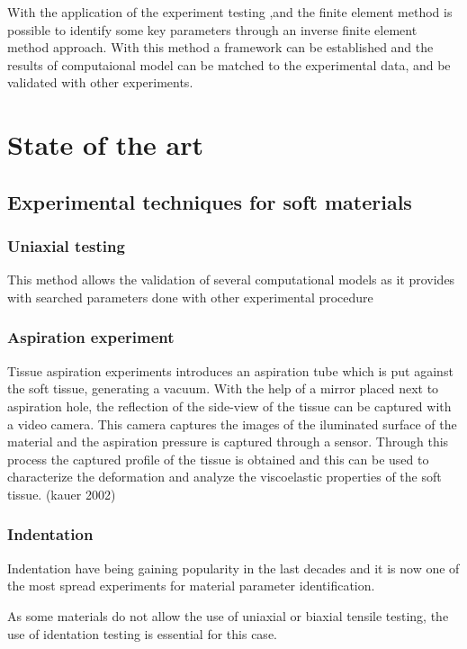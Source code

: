  With the application of the experiment testing ,and the finite element method is possible 
 to identify some key parameters through an inverse finite element method approach. With this 
 method a framework can be established and the results of computaional model can be matched 
 to the experimental data, and be validated with other experiments.

\section{State of the art}

\subsection{Experimental techniques for soft materials}
\subsubsection{Uniaxial testing}
This method allows the validation of several computational models as it provides with
 searched parameters done with other experimental procedure

\subsubsection{Aspiration experiment}

Tissue aspiration experiments introduces an aspiration tube which is put against the 
soft tissue, generating a vacuum. With the help of a mirror placed next to aspiration 
hole, the reflection of the side-view of the tissue can be captured with a video camera.
This camera captures the images of the iluminated surface of the material and the 
aspiration pressure is captured through a sensor. Through this process the captured 
profile of the tissue is obtained and this can be used to characterize the deformation 
and analyze the viscoelastic properties of the soft tissue. (kauer 2002)

\subsubsection{Indentation}
Indentation have being gaining popularity in the last decades and it is now one of
 the most spread experiments for material parameter identification.

As some materials do not allow the use of uniaxial or biaxial tensile testing, the
 use of identation testing is essential for this case. 

